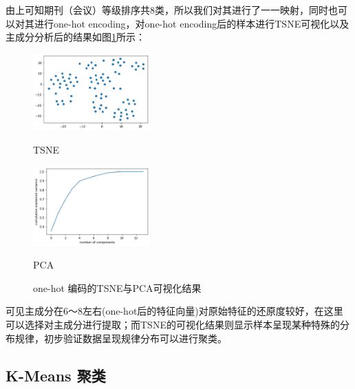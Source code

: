 由上可知期刊（会议）等级排序共8类，所以我们对其进行了一一映射，同时也可以对其进行one-hot encoding，对one-hot encoding后的样本进行TSNE可视化以及主成分分析后的结果如图\ref{TSNE-PCA-one-hot}所示：
\begin{figure}[htb]
    \vspace{13pt} %
    \centering
    \begin{minipage}[htb]{0.5\textwidth}
    \includegraphics[width=0.4\textwidth]{images/TSNE-one-hot.png}
    \caption{TSNE}
    \end{minipage}
    \begin{minipage}[htb]{0.5\textwidth}
    \includegraphics[width=0.4\textwidth]{images/PCA-one-hot.png}
    \caption{PCA}
    \end{minipage}
    \caption{one-hot 编码的TSNE与PCA可视化结果}\label{TSNE-PCA-one-hot} %
  \end{figure}
  




可见主成分在6～8左右(one-hot后的特征向量)对原始特征的还原度较好，在这里可以选择对主成分进行提取；而TSNE的可视化结果则显示样本呈现某种特殊的分布规律，初步验证数据呈现规律分布可以进行聚类。

\subsection{K-Means 聚类}

